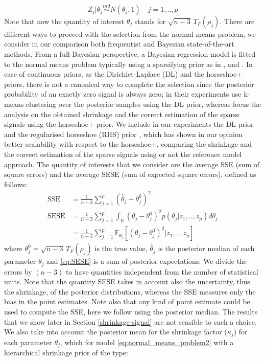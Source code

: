 \documentclass[american,]{article}
\theoremstyle{definition}
\begin{document}
\
\begin{equation} \label{eq:normal_means_problem2}
Z_{j}|\theta_{j}\overset{ind}{\sim}N(\theta_{j},1) \quad j=1,..,p
\end{equation}
Note that now the quantity of interest $\theta_{j}$ stands for $\sqrt{n-3}\,T_{F}(\rho_{j})$. There are different ways to proceed with the selection from the normal means problem, we consider in our comparison both frequentist and Bayesian state-of-the-art methods. From a full-Bayesian perspective, a Bayesian regression model is fitted to the normal means problem typically using a sparsifying prior as in \cite{paper:dirichlet_laplace}, \cite{bhadra2017horseshoe+} and \cite{johnstone2004needles}. In case of continuous priors, as the Dirichlet-Laplace (DL) and the horseshoe+ priors, there is not a canonical way to complete the selection since the posterior probability of an exactly zero signal is always zero; in their experiments \cite{paper:dirichlet_laplace} use k-means clustering over the posterior samples using the DL prior, whereas \cite{bhadra2017horseshoe+} focus the analysis on the obtained shrinkage and the correct estimation of the sparse signals using the horseshoe+ prior. We include in our experiments the DL prior and the regularised horseshoe (RHS) prior \citep{paper:rhs}, which has shown in our opinion better scalability with respect to the horseshoe+, comparing the shrinkage and the correct estimation of the sparse signals using or not the reference model approach. The quantity of interests that we consider are the average SSE (sum of square errors) and the average SESE (sum of expected square errors), defined as follows:
\
\begin{align}
\text{SSE}&=\frac{1}{n-3}\sum_{j=1}^{p}(\hat{\theta}_{j} - \theta^{0}_{j})^{2} \label{eq:SSE} \\
\text{SESE}&=\frac{1}{n-3}\sum_{j=1}^{p}\int_{\mathbb{R}}(\theta_{j}-\theta^{0}_{j})^{2}p(\theta_{j}|z_{1},..,z_{p})d\theta_{j} \\
&=\frac{1}{n-3}\sum_{j=1}^{p}\mathbb{E}_{\theta_{j}}[(\theta_{j}-\theta^{0}_{j})^{2}|z_{1},..,z_{p}] \label{eq:SESE}
\end{align}
where $\theta_{j}^{0}=\sqrt{n-3}\,T_{F}(\rho_{j})$ is the true value, $\hat{\theta}_{j}$ is the posterior median of each parameter $\theta_{j}$ and \eqref{eq:SESE} is a sum of posterior expectations. We divide the errors by $(n-3)$ to have quantities independent from the number of statistical units. Note that the quantity SESE takes in account also the uncertainty, thus the shrinkage, of the posterior distributions, whereas the SSE measures only the bias in the point estimates. Note also that any kind of point estimate could be used to compute the SSE, here we follow \cite{paper:dirichlet_laplace} using the posterior median. The results that we show later in Section \ref{shrinkage-signal} are not sensible to such a choice. We also take into account the posterior mean for the shrinkage factor ($\kappa_{j}$) for each parameter $\theta_{j}$, which for model \eqref{eq:normal_means_problem2} with a hierarchical shrinkage prior of the type:
\end{document}
